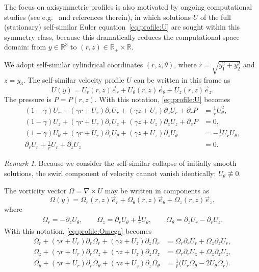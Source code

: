 \documentclass[11pt,reqno]{amsproc}
\numberwithin{equation}{section}
\theoremstyle{remark}
\newtheorem{remark}[theorem]{Remark}
\begin{document}
{The focus on axisymmetric profiles is also motivated by ongoing computational studies (see e.g.~\cite{PumirSiggia92,GuoLuo14,HouDeHuang22,Hou23,WLGZB23} and references therein), in which solutions $U$ of the full (stationary) self-similar Euler equation~\eqref{eq:profile:U} are sought  within this symmetry class, because this dramatically reduces the computational space domain: from $y \in \mathbb{R}^3$ to $(r,z) \in \mathbb{R}_+ \times \mathbb{R}$.} 

We adopt self-similar cylindrical coordinates $(r, z, \theta)$, where $r = \sqrt{y_1^2 + y_2^2}$ and $z = y_3$. The self-similar velocity profile $U$ can be written in this frame as
\[
U(y) = U_r(r, z) \vec{e}_r + U_\theta(r, z) \vec{e}_\theta + U_z(r, z) \vec{e}_z.
\]
The pressure is $P = P(r,z)$. With this notation, \eqref{eq:profile:U} becomes
\begin{equation}
\label{eq:profile:U:axisym}
\begin{aligned}
(1-\gamma) U_r + (\gamma r + U_r) \partial_r U_r + (\gamma z + U_z) \partial_z U_r  + \partial_r P 
&= \frac{1}{r} U_\theta^2, \\
(1-\gamma) U_z + (\gamma r + U_r) \partial_r U_z + (\gamma z + U_z) \partial_z U_z + \partial_z P
&=0 , \\
(1-\gamma) U_\theta + (\gamma r + U_r) \partial_r U_\theta + (\gamma z + U_z) \partial_z U_\theta
&=-\frac{1}{r} U_r U_\theta ,
\\
\partial_r U_r + \frac{1}{r} U_r + \partial_z U_z &=0.
\end{aligned}
\end{equation}
{
\begin{remark}
\label{rem:yes:swirl}
Because we consider the self-similar collapse of initially smooth solutions, the swirl component of velocity cannot vanish identically: $U_\theta \not \equiv 0$. 
\end{remark}
}

The vorticity vector $\Omega = \nabla \times U$ may be written in components as 
\[
\Omega(y) = \Omega_r(r, z) \vec{e}_r + \Omega_\theta(r, z) \vec{e}_\theta + \Omega_z(r, z) \vec{e}_z,
\]
where
\begin{align}
\Omega_r = - \partial_z U_\theta, 
\qquad
\Omega_z = \partial_r U_\theta + \tfrac{1}{r} U_\theta,
\qquad
\Omega_\theta = \partial_z U_r - \partial_r U_z. 
\label{eq:Omega:components:def}
\end{align}
With this notation, \eqref{eq:profile:Omega} becomes 
\begin{equation}
\label{eq:profile:Omega:axisym}
\begin{aligned}
\Omega_r + (\gamma r + U_r) \partial_r \Omega_r + (\gamma z + U_z) \partial_z \Omega_r    
&= \Omega_r \partial_r U_r + \Omega_z \partial_z U_r, \\
\Omega_z + (\gamma r + U_r) \partial_r \Omega_z + (\gamma z + U_z) \partial_z \Omega_z  
&= \Omega_r \partial_r U_z + \Omega_z \partial_z U_z  , \\
\Omega_\theta + (\gamma r + U_r) \partial_r \Omega_\theta + (\gamma z + U_z) \partial_z \Omega_\theta
&= \frac{1}{r} \bigl(U_r \Omega_\theta - 2 U_\theta \Omega_r \bigr).
\end{aligned}
\end{equation}
\end{document}
